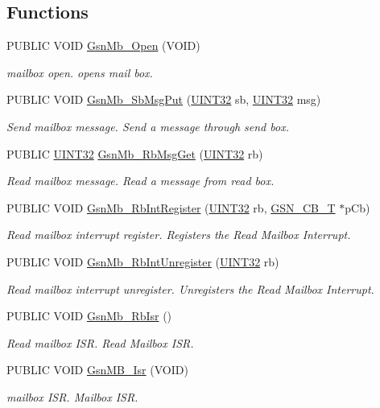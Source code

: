 \subsection*{Functions}
\begin{DoxyCompactItemize}
\item 
PUBLIC VOID \hyperlink{a00624_ga5c877a50bab8634f61b36946a257d364}{GsnMb\_\-Open} (VOID)
\begin{DoxyCompactList}\small\item\em mailbox open. opens mail box. \end{DoxyCompactList}\item 
PUBLIC VOID \hyperlink{a00624_ga3b236d5592b80003e2454e09fdb684f6}{GsnMb\_\-SbMsgPut} (\hyperlink{a00660_gae1e6edbbc26d6fbc71a90190d0266018}{UINT32} sb, \hyperlink{a00660_gae1e6edbbc26d6fbc71a90190d0266018}{UINT32} msg)
\begin{DoxyCompactList}\small\item\em Send mailbox message. Send a message through send box. \end{DoxyCompactList}\item 
PUBLIC \hyperlink{a00660_gae1e6edbbc26d6fbc71a90190d0266018}{UINT32} \hyperlink{a00624_gae4ec736485020de1b55a348e12692d87}{GsnMb\_\-RbMsgGet} (\hyperlink{a00660_gae1e6edbbc26d6fbc71a90190d0266018}{UINT32} rb)
\begin{DoxyCompactList}\small\item\em Read mailbox message. Read a message from read box. \end{DoxyCompactList}\item 
PUBLIC VOID \hyperlink{a00624_gae52a4cb7b044f2fadba7da7ca233e5de}{GsnMb\_\-RbIntRegister} (\hyperlink{a00660_gae1e6edbbc26d6fbc71a90190d0266018}{UINT32} rb, \hyperlink{a00036}{GSN\_\-CB\_\-T} $\ast$pCb)
\begin{DoxyCompactList}\small\item\em Read mailbox interrupt register. Registers the Read Mailbox Interrupt. \end{DoxyCompactList}\item 
PUBLIC VOID \hyperlink{a00624_gad7650d45bacf6a9836945238c052ba80}{GsnMb\_\-RbIntUnregister} (\hyperlink{a00660_gae1e6edbbc26d6fbc71a90190d0266018}{UINT32} rb)
\begin{DoxyCompactList}\small\item\em Read mailbox interrupt unregister. Unregisters the Read Mailbox Interrupt. \end{DoxyCompactList}\item 
PUBLIC VOID \hyperlink{a00624_ga1bec0f48d9589185fd0e4dc08350fba4}{GsnMb\_\-RbIsr} ()
\begin{DoxyCompactList}\small\item\em Read mailbox ISR. Read Mailbox ISR. \end{DoxyCompactList}\item 
PUBLIC VOID \hyperlink{a00624_ga853cbc16429dc144020969ee32fc4d53}{GsnMB\_\-Isr} (VOID)
\begin{DoxyCompactList}\small\item\em mailbox ISR. Mailbox ISR. \end{DoxyCompactList}\end{DoxyCompactItemize}


